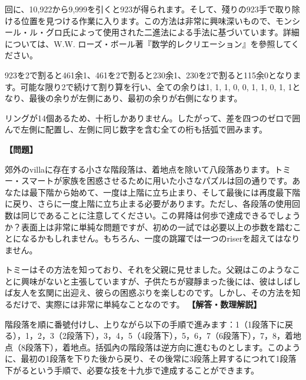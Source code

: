 \documentclass[10pt,a4paper,oneside,openany]{ltjsbook}
\begin{document}
\begin{tcolorbox}[colback=softblue,colframe=primaryblue,title=\textbf{第 417 問：疲労する鐸羣れ （原題: THE TIRING IRONS.）},arc=2mm,boxrule=1pt,breakable]
回に、10,922から9,999を引くと923が得られます。そして、殘りの923手で取り除ける位置を見つける作業に入ります。この方法は非常に興味深いもので、モンシール・ル・グロ氏によって使用された二進法による手法に基づいています。詳細については、W.W. ローズ・ボール著『数学的レクリエーション』を參照してください。

923を2で割ると461余1、461を2で割ると230余1、230を2で割ると115余0となります。可能な限り2で続けて割り算を行い、全ての余りは1, 1, 1, 0, 0, 1, 1, 0, 1, 1となり、最後の余りが左側にあり、最初の余りが右側になります。

リングが14個あるため、十桁しかありません。したがって、差を四つのゼロで囲んで左側に配置し、左側に同じ数字を含む全ての桁も括弧で囲みます。
\end{tcolorbox}

\begin{tcolorbox}[colback=softblue,colframe=primaryblue,title=\textbf{第 418 問：階段落を上るなんてJsonValue如此です。 （原題: SUCH A GETTING UPSTAIRS.）},arc=2mm,boxrule=1pt,breakable]
\textbf{【問題】}\par\vspace{0.3em}
郊外のvillaに存在する小さな階段落は、着地点を除いて八段落あります。トミー・スマートが家族を困惑させるために用いた小さなパズルは回の通りです。あなたは最下階から始めて、一度は上階に立ち止まり、そして最後には再度最下階に戻り、さらに一度上階に立ち止まる必要があります。ただし、各段落の使用回数は同じであることに注意してください。この昇降は何歩で達成できるでしょうか？表面上は非常に単純な問題ですが、初めの一試では必要以上の歩数を踏むことになるかもしれません。もちろん、一度の跳躍では一つのriserを超えてはなりません。

トミーはその方法を知っており、それを父親に見せました。父親はこのようなことに興味がないと主張していますが、子供たちが寢靜まった後には、彼はしばしば友人を玄関に出迎え、彼らの困惑ぶりを楽しむのです。しかし、その方法を知るだけで、実際には非常に単純なことなのです。
\tcblower
\textbf{【解答・数理解説】}\par\vspace{0.3em}
階段落を順に番號付けし、上りながら以下の手順で進みます：1（1段落下に戻る），1，2，3（2段落下），3，4，5（4段落下），5，6，7（6段落下），7，8，着地点（8段落下），着地点。括弧內の階段落は逆方向に進むものとします。このように、最初の1段落を下りた後から戻り、その後常に3段落上昇するにつれて1段落下がるという手順で、必要な技を十九歩で達成することができます。
\end{tcolorbox}
\end{document}
